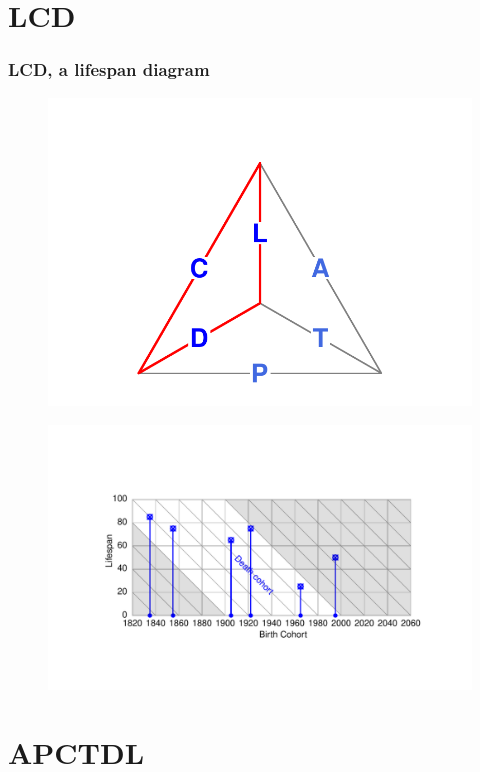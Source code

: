\documentclass[20pt]{beamer}
\begin{document}
\section{LCD}
\begin{frame}
\frametitle{LCD, a lifespan diagram}
\vspace{-6em}
\begin{figure}
\raggedleft
    \includegraphics[scale=.7]{Figures/TetraLCDprg.pdf}
\end{figure}
\vspace{-3em}
\begin{figure}[b]
    \centering
    \includegraphics{Figures/LCD.pdf}
\end{figure} 
\end{frame}

\section{APCTDL}
\end{document}

